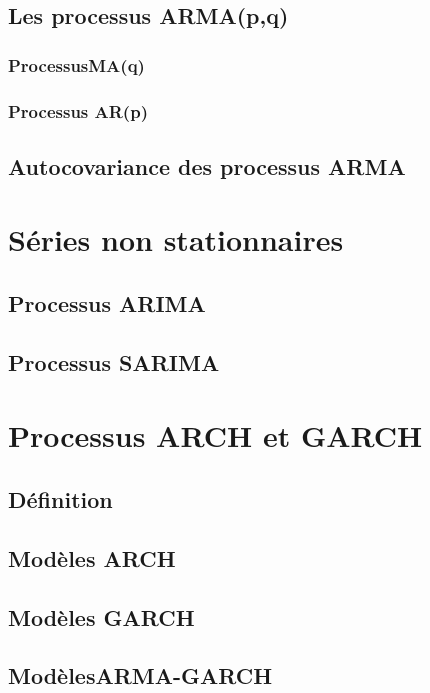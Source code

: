 \documentclass[
]{book}
\theoremstyle{definition}
\theoremstyle{definition}
\theoremstyle{definition}
\theoremstyle{definition}
\theoremstyle{remark}
\begin{document}
\hypertarget{les-processus-armapq}{%
\section{Les processus ARMA(p,q)}\label{les-processus-armapq}}

\hypertarget{processusmaq}{%
\subsection{ProcessusMA(q)}\label{processusmaq}}

\hypertarget{processus-arp}{%
\subsection{Processus AR(p)}\label{processus-arp}}

\hypertarget{autocovariance-des-processus-arma}{%
\section{Autocovariance des processus ARMA}\label{autocovariance-des-processus-arma}}

\hypertarget{proc-non-stat}{%
\chapter{Séries non stationnaires}\label{proc-non-stat}}

\hypertarget{processus-arima}{%
\section{Processus ARIMA}\label{processus-arima}}

\hypertarget{processus-sarima}{%
\section{Processus SARIMA}\label{processus-sarima}}

\hypertarget{ARCH-GARCH}{%
\chapter{Processus ARCH et GARCH}\label{ARCH-GARCH}}

\hypertarget{duxe9finition-6}{%
\section{Définition}\label{duxe9finition-6}}

\hypertarget{moduxe8les-arch}{%
\section{Modèles ARCH}\label{moduxe8les-arch}}

\hypertarget{moduxe8les-garch}{%
\section{Modèles GARCH}\label{moduxe8les-garch}}

\hypertarget{moduxe8lesarma-garch}{%
\section{ModèlesARMA-GARCH}\label{moduxe8lesarma-garch}}

  
\end{document}
